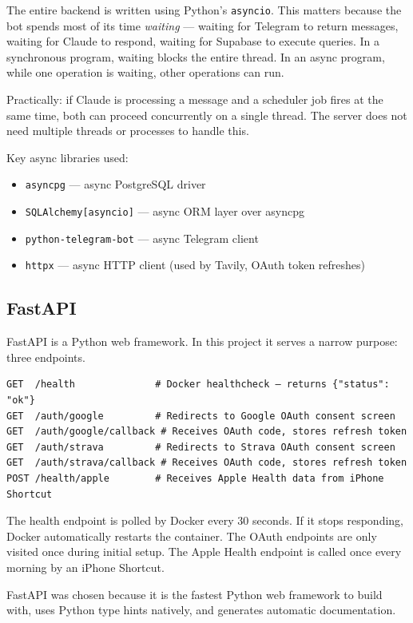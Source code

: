 \documentclass[12pt, a4paper]{article}
\begin{document}
The entire backend is written using Python's \texttt{asyncio}. This matters because the bot spends most of its time \textit{waiting} --- waiting for Telegram to return messages, waiting for Claude to respond, waiting for Supabase to execute queries. In a synchronous program, waiting blocks the entire thread. In an async program, while one operation is waiting, other operations can run.

Practically: if Claude is processing a message and a scheduler job fires at the same time, both can proceed concurrently on a single thread. The server does not need multiple threads or processes to handle this.

Key async libraries used:
\begin{itemize}[noitemsep]
    \item \texttt{asyncpg} --- async PostgreSQL driver
    \item \texttt{SQLAlchemy[asyncio]} --- async ORM layer over asyncpg
    \item \texttt{python-telegram-bot} --- async Telegram client
    \item \texttt{httpx} --- async HTTP client (used by Tavily, OAuth token refreshes)
\end{itemize}

\subsection{FastAPI}

FastAPI is a Python web framework. In this project it serves a narrow purpose: three endpoints.

\begin{lstlisting}
GET  /health              # Docker healthcheck — returns {"status": "ok"}
GET  /auth/google         # Redirects to Google OAuth consent screen
GET  /auth/google/callback # Receives OAuth code, stores refresh token
GET  /auth/strava         # Redirects to Strava OAuth consent screen
GET  /auth/strava/callback # Receives OAuth code, stores refresh token
POST /health/apple        # Receives Apple Health data from iPhone Shortcut
\end{lstlisting}

The health endpoint is polled by Docker every 30 seconds. If it stops responding, Docker automatically restarts the container. The OAuth endpoints are only visited once during initial setup. The Apple Health endpoint is called once every morning by an iPhone Shortcut.

FastAPI was chosen because it is the fastest Python web framework to build with, uses Python type hints natively, and generates automatic documentation.
\end{document}
